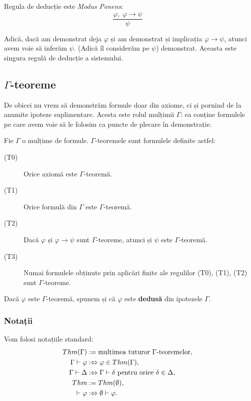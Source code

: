 Regula de deducție este \textit{Modus Ponens}:
\[
	\frac{\varphi, \; \varphi \to \psi}{\psi}
\]

Adică, dacă am demonstrat deja \( \varphi \) și am demonstrat și implicația \( \varphi \to \psi \), atunci avem voie să inferăm \( \psi \). (Adică îl considerăm
pe \( \psi \)) demonstrat.
Aceasta este singura regulă de deducție a sistemului.

\subsection{\( \Gamma \)-teoreme}

De obicei nu vrem să demonstrăm formule doar din axiome, ci și pornind de la anumite ipoteze suplimentare. Acesta este rolul mulțimii \( \Gamma \):
ea conține formulele pe care avem voie să le folosim ca puncte de plecare în demonstrație.

\begin{definition}
	Fie \( \Gamma \) o mulțime de formule. \( \Gamma \)-teoremele sunt formulele definite astfel:

	\begin{description}
		\item[(T0)] Orice axiomă este \( \Gamma \)-teoremă.
		\item[(T1)] Orice formulă din \( \Gamma \) este \( \Gamma \)-teoremă.
		\item[(T2)] Dacă \( \varphi \) și \( \varphi \to \psi \) sunt \( \Gamma \)-teoreme, atunci și \( \psi \) este \( \Gamma \)-teoremă.
		\item[(T3)] Numai formulele obținute prin aplicări finite ale regulilor (T0), (T1), (T2) sunt \( \Gamma \)-teoreme.
	\end{description}

	Dacă \( \varphi \) este \( \Gamma \)-teoremă, spunem și că \( \varphi \) este \textbf{dedusă} din ipotezele \( \Gamma \).
\end{definition}

\subsubsection*{Notații}

Vom folosi notațiile standard:
\[
	\begin{aligned}
		Thm(\Gamma)           & := \text{mulțimea tuturor \( \Gamma \)-teoremelor},                            \\
		\Gamma \vdash \varphi & :\Leftrightarrow \varphi \in Thm(\Gamma),                                      \\
		\Gamma \vdash \Delta  & :\Leftrightarrow \Gamma \vdash \delta \text{ pentru orice } \delta \in \Delta, \\
		Thm                   & := Thm(\emptyset),                                                             \\
		\vdash \varphi        & :\Leftrightarrow \emptyset \vdash \varphi.
	\end{aligned}
\]

